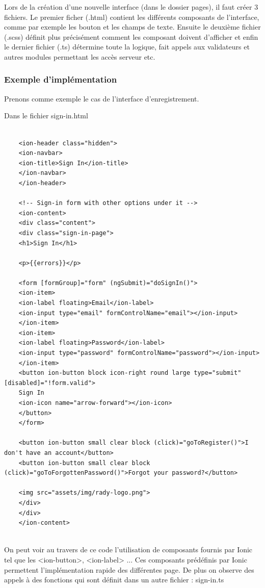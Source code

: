 \documentclass[french]{article}
\begin{document}
	Lors de la création d'une nouvelle interface (dans le dossier pages), il faut créer 3 fichiers. Le premier ficher (.html) contient les différents composants de l'interface, comme par exemple les bouton et les champs de texte. Ensuite le deuxième fichier (.scss) définit plus précisément comment les composant doivent d'afficher et enfin le dernier fichier (.ts) détermine toute la logique, fait appels aux validateurs et autres modules permettant les accès serveur etc.
	
	\subsubsection{Exemple d'implémentation}
	
	Prenons comme exemple le cas de l'interface d'enregistrement.
	
	Dans le fichier sign-in.html
	
	\lstset{language = HTML5}
	
	\begin{lstlisting}
	
	<ion-header class="hidden">
	<ion-navbar>
	<ion-title>Sign In</ion-title>
	</ion-navbar>
	</ion-header>
	
	<!-- Sign-in form with other options under it -->
	<ion-content>
	<div class="content">
	<div class="sign-in-page">
	<h1>Sign In</h1>
	
	<p>{{errors}}</p>
	
	<form [formGroup]="form" (ngSubmit)="doSignIn()">
	<ion-item>
	<ion-label floating>Email</ion-label>
	<ion-input type="email" formControlName="email"></ion-input>
	</ion-item>
	<ion-item>
	<ion-label floating>Password</ion-label>
	<ion-input type="password" formControlName="password"></ion-input>
	</ion-item>
	<button ion-button block icon-right round large type="submit" [disabled]="!form.valid">
	Sign In
	<ion-icon name="arrow-forward"></ion-icon>
	</button>
	</form>
	
	<button ion-button small clear block (click)="goToRegister()">I don't have an account</button>
	<button ion-button small clear block (click)="goToForgottenPassword()">Forgot your password?</button>
	
	<img src="assets/img/rady-logo.png">
	</div>
	</div>
	</ion-content>
	
	\end{lstlisting}
	
	On peut voir au travers de ce code l'utilisation de composants fournis par Ionic tel que les <ion-button>, <ion-label> ...
	Ces composants prédéfinis par Ionic permettent l'implémentation rapide des différentes page.
	De plus on observe des appels à des fonctions qui sont définit dans un autre fichier : sign-in.ts
	
\end{document}
